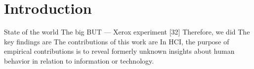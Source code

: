 \section{Introduction}

State of the world \newline
The big BUT\newline
--- Xerox experiment [32] \newline
Therefore, we did\newline
The key findings are\newline
The contributions of this work are\newline
In HCI, the purpose of empirical contributions is to reveal formerly unknown insights about human behavior in relation to information or technology.

